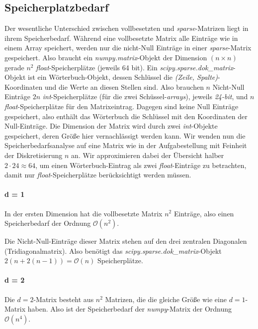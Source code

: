 \documentclass[smallheadings]{scrartcl}
\begin{document}
\subsection{Speicherplatzbedarf}
\label{sec:bedarf}
Der wesentliche Unterschied zwischen vollbesetzten und \textit{sparse}-Matrizen  liegt in ihrem Speicherbedarf. Während eine vollbesetzte Matrix alle Einträge wie in einem Array speichert, werden nur die nicht-Null Einträge in einer \textit{sparse}-Matrix gespeichert. Also braucht ein \textit{numpy.matrix}-Objekt der Dimension $(n \times n)$ gerade $n^2$ \textit{float}-Speicherplätze (jeweils 64 bit). Ein \textit{scipy.sparse.dok\_matrix}-Objekt  ist ein Wörterbuch-Objekt, dessen Schlüssel die \textit{(Zeile, Spalte)}-Koordinaten und die Werte an diesen Stellen sind. 
Also brauchen $n$ Nicht-Null Einträge $2n$ \textit{int}-Speicherplätze (für die zwei Schüssel-\textit{arrays}), jeweils \textit{24-bit}, und $n$ \textit{float}-Speicherplätze für den Matrixeintrag. Dagegen sind keine Null Einträge gespeichert, also enthält das Wörterbuch die Schlüssel mit den Koordinaten der Null-Einträge. Die Dimension der Matrix wird durch zwei \textit{int}-Objekte gespeichert, deren Größe hier vernachlässigt werden kann. Wir wenden nun die Speicherbedarfsanalyse auf eine Matrix wie in der Aufgabestellung mit Feinheit der Diskretisierung $n$ an. Wir approximieren dabei der Übersicht halber $2 \cdot 24 \approx 64$, um einen Wörterbuch-Eintrag als zwei \textit{float}-Einträge zu betrachten, damit nur \textit{float}-Speicherplätze berücksichtigt werden müssen.

\paragraph{d = 1}
In der ersten Dimension hat die vollbesetzte Matrix $n^2$ Einträge, also einen Speicherbedarf der Ordnung $\mathcal{O}(n^2)$.

Die Nicht-Null-Einträge dieser Matrix stehen auf den drei zentralen Diagonalen (Tridiagonalmatrix). Also benötigt das \textit{scipy.sparse.dok\_matrix}-Objekt $2(n+2(n-1)) = \mathcal{O}(n)$ Speicherplätze.

\paragraph{d = 2}
Die $d=2$-Matrix besteht aus $n^2$ Matrizen, die die gleiche Größe wie eine $d=1$-Matrix haben. Also ist der Speicherbedarf der \textit{numpy}-Matrix der Ordnung $\mathcal{O}(n^4)$.
\end{document}
